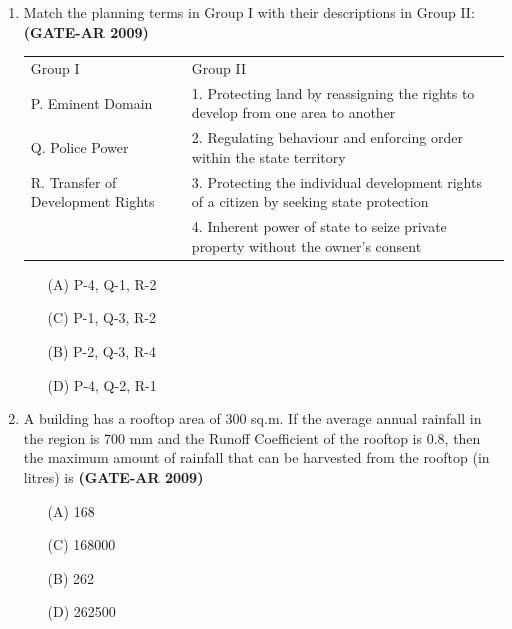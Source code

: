 \documentclass[a4paper,10pt]{article}
\begin{document}
\begin{enumerate}
    \item Match the planning terms in Group I with their descriptions in Group II: \hfill \textbf{(GATE-AR 2009)} \\
    \begin{tabular}{ p p }
	Group I & Group II \\
	P. Eminent Domain & 1. Protecting land by reassigning the rights to develop from one area to another \\
	Q. Police Power & 2. Regulating behaviour and enforcing order within the state territory \\
	R. Transfer of Development Rights & 3. Protecting the individual development rights of a citizen by seeking state protection \\
	& 4. Inherent power of state to seize private property without the owner’s consent \\
	\end{tabular}
	\begin{multicols}{2}
	\begin{itemize}
        \item[(A)] P-4, Q-1, R-2
        \item[(C)] P-1, Q-3, R-2
        \item[(B)] P-2, Q-3, R-4
        \item[(D)] P-4, Q-2, R-1
    \end{itemize}
	\end{multicols}

    \item A building has a rooftop area of 300 sq.m. If the average annual rainfall in the region is 700 mm and the Runoff Coefficient of the rooftop is 0.8, then the maximum amount of rainfall that can be harvested from the rooftop (in litres) is \hfill \textbf{(GATE-AR 2009)}
    \begin{multicols}{2}
	\begin{itemize}
        \item[(A)] 168
        \item[(C)] 168000
        \item[(B)] 262
        \item[(D)] 262500
    \end{itemize}
	\end{multicols}


\end{enumerate}
\end{document}
